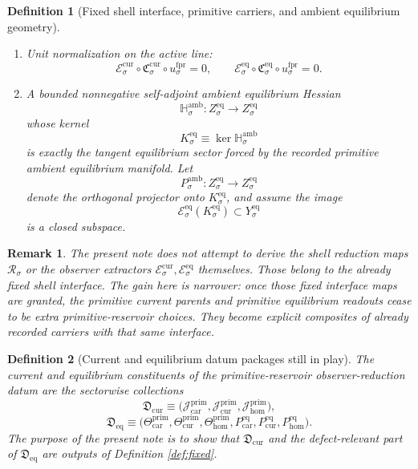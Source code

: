 \documentclass[11pt]{article}
\newcommand{\Car}{\mathrm{car}}
\newcommand{\Cur}{\mathrm{cur}}
\newcommand{\Hom}{\mathrm{hom}}
\newcommand{\ForSpace}[1]{\mathcal I_{#1}^{\mathrm{for}}}
\newcommand{\ForPrimInc}[1]{\iota_{#1}^{\mathrm{fpr}}}
\newcommand{\ForPrimUnit}[1]{u_{#1}^{\mathrm{fpr}}}
\newcommand{\Reduction}[1]{\mathcal R_{#1}}
\newcommand{\ObsCurrent}[1]{\mathcal J_{#1}}
\newcommand{\ObsTheta}[1]{\Theta_{#1}}
\newcommand{\PrimCurrent}[1]{\mathcal J_{#1}^{\mathrm{prim}}}
\newcommand{\PrimTheta}[1]{\Theta_{#1}^{\mathrm{prim}}}
\newcommand{\EqProj}[1]{P_{#1}^{\mathrm{eq}}}
\newcommand{\AmbientEqProj}[1]{P_{#1}^{\mathrm{amb}}}
\newcommand{\CurrentCarrier}[1]{\mathfrak C_{#1}^{\mathrm{cur}}}
\newcommand{\EqCarrier}[1]{\mathfrak C_{#1}^{\mathrm{eq}}}
\newcommand{\CurrentExtract}[1]{\mathscr E_{#1}^{\mathrm{cur}}}
\newcommand{\EqExtract}[1]{\mathscr E_{#1}^{\mathrm{eq}}}
\newcommand{\AmbientHess}[1]{\mathbb H_{#1}^{\mathrm{amb}}}
\newcommand{\EqKernel}[1]{K_{#1}^{\mathrm{eq}}}
\newcommand{\CurrentPackage}{\mathfrak D_{\mathrm{cur}}}
\newcommand{\EqPackage}{\mathfrak D_{\mathrm{eq}}}
\newtheorem{definition}{Definition}
\newtheorem{remark}{Remark}
\begin{document}
\begin{definition}[Fixed shell interface, primitive carriers, and ambient equilibrium geometry]
\begin{enumerate}
\begin{equation}
    \CurrentExtract{\sigma}\circ \CurrentCarrier{\sigma}\circ \ForPrimInc{\sigma}
    =
    \ObsCurrent{\sigma}\circ \Reduction{\sigma},
    \label{eq:current_shell_identity}
    \end{equation}
    \begin{equation}
    \EqExtract{\sigma}\circ \EqCarrier{\sigma}\circ \ForPrimInc{\sigma}
    =
    \ObsTheta{\sigma}\circ \Reduction{\sigma}
    \label{eq:eq_shell_identity}
    \end{equation}
    hold on \(\ForSpace{\sigma}\).
    \item Unit normalization on the active line:
    \begin{equation}
    \CurrentExtract{\sigma}\circ \CurrentCarrier{\sigma}\circ \ForPrimUnit{\sigma}=0,
    \qquad
    \EqExtract{\sigma}\circ \EqCarrier{\sigma}\circ \ForPrimUnit{\sigma}=0.
    \label{eq:unit_normalization}
    \end{equation}
    \item A bounded nonnegative self-adjoint ambient equilibrium Hessian
    \[
    \AmbientHess{\sigma}:Z_{\sigma}^{\mathrm{eq}}\to Z_{\sigma}^{\mathrm{eq}}
    \]
    whose kernel
    \[
    \EqKernel{\sigma}\equiv \ker \AmbientHess{\sigma}
    \]
    is exactly the tangent equilibrium sector forced by the recorded primitive ambient equilibrium manifold. Let
    \[
    \AmbientEqProj{\sigma}:Z_{\sigma}^{\mathrm{eq}}\to Z_{\sigma}^{\mathrm{eq}}
    \]
    denote the orthogonal projector onto \(\EqKernel{\sigma}\), and assume the image
    \[
    \EqExtract{\sigma}(\EqKernel{\sigma})\subset Y_{\sigma}^{\mathrm{eq}}
    \]
    is a closed subspace.
\end{enumerate}
\end{definition}

\begin{remark}
The present note does not attempt to derive the shell reduction maps \(\Reduction{\sigma}\) or the observer extractors \(\CurrentExtract{\sigma},\EqExtract{\sigma}\) themselves. Those belong to the already fixed shell interface. The gain here is narrower: once those fixed interface maps are granted, the primitive current parents and primitive equilibrium readouts cease to be extra primitive-reservoir choices. They become explicit composites of already recorded carriers with that same interface.
\end{remark}

\begin{definition}[Current and equilibrium datum packages still in play]
\label{def:packages}
The current and equilibrium constituents of the primitive-reservoir observer-reduction datum are the sectorwise collections
\[
\CurrentPackage
\equiv
\bigl(
\PrimCurrent{\Car},
\PrimCurrent{\Cur},
\PrimCurrent{\Hom}
\bigr),
\]
\[
\EqPackage
\equiv
\bigl(
\PrimTheta{\Car},
\PrimTheta{\Cur},
\PrimTheta{\Hom},
\EqProj{\Car},
\EqProj{\Cur},
\EqProj{\Hom}
\bigr).
\]
The purpose of the present note is to show that \(\CurrentPackage\) and the defect-relevant part of \(\EqPackage\) are outputs of Definition \ref{def:fixed}.
\end{definition}
\end{document}
